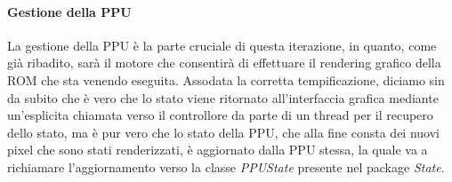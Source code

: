 \documentclass[11pt]{article}
\begin{document}
\paragraph{Gestione della PPU}
La gestione della PPU è la parte cruciale di questa iterazione, in quanto, come già ribadito, sarà il motore che consentirà di effettuare il rendering grafico della ROM che sta venendo eseguita. Assodata la corretta tempificazione, diciamo sin da subito che è vero che lo stato viene ritornato all'interfaccia grafica mediante un'esplicita chiamata verso il controllore da parte di un thread per il recupero dello stato, ma è pur vero che lo stato della PPU, che alla fine consta dei nuovi pixel che sono stati renderizzati, è aggiornato dalla PPU stessa, la quale va a richiamare l'aggiornamento verso la classe \emph{PPUState} presente nel package \emph{State}.
\end{document}
